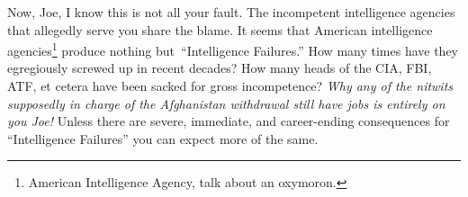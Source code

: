 Now, Joe, I know this is not all your fault. The incompetent
intelligence agencies that allegedly serve you share the blame. It seems
that American intelligence
agencies\footnote{American Intelligence Agency, 
talk about an oxymoron.
} produce nothing
but~``Intelligence Failures.'' How many times have they egregiously
screwed up in recent decades? How many heads of the CIA, FBI, ATF, et
cetera have been sacked for gross incompetence? \emph{Why any of the
nitwits supposedly in charge of the Afghanistan withdrawal still have
jobs is entirely on you Joe!} Unless there are severe, immediate, and
career-ending consequences for ``Intelligence Failures'' you can expect
more of the same.

%



%
 

